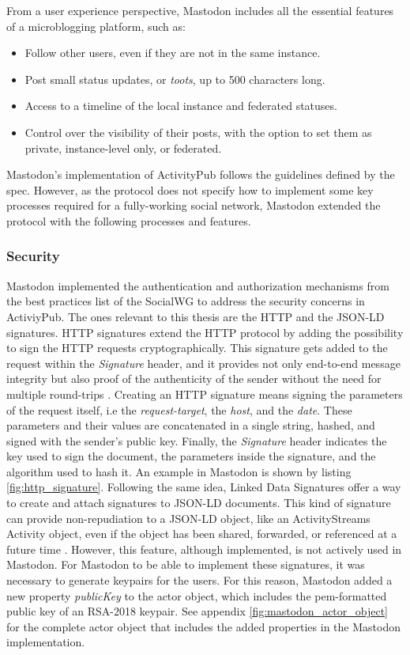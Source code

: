  From a user experience perspective, Mastodon includes all the essential features of a microblogging platform, such as:

\begin{itemize}
  \item Follow other users, even if they are not in the same instance. 
  \item Post small status updates, or \emph{toots}, up to 500 characters long. 
  \item Access to a timeline of the local instance and federated statuses. 
  \item Control over the visibility of their posts, with the option to set them as private, instance-level only, or federated. 
\end{itemize}

Mastodon's implementation of ActivityPub follows the guidelines defined by the spec. However, as the protocol does not specify how to implement some key processes required for a fully-working social network, Mastodon extended the protocol with the following processes and features.

\subsubsection*{\textbf{Security}}
Mastodon implemented the authentication and authorization mechanisms from the best practices list of the SocialWG to address the security concerns in ActiviyPub. The ones relevant to this thesis are the HTTP and the JSON-LD signatures. HTTP signatures extend the HTTP protocol by adding the possibility to sign the HTTP requests cryptographically. This signature gets added to the request within the \emph{Signature} header, and it provides not only end-to-end message integrity but also proof of the authenticity of the sender without the need for multiple round-trips \cite{cavage_sporny_2019}. Creating an HTTP signature means signing the parameters of the request itself, i.e the \emph{request-target}, the \emph{host}, and the \emph{date}. These parameters and their values are concatenated in a single string, hashed, and signed with the sender's public key. Finally, the \emph{Signature} header indicates the key used to sign the document, the parameters inside the signature, and the algorithm used to hash it. An example in Mastodon is shown by listing \ref{fig:http_signature}. 
Following the same idea, Linked Data Signatures offer a way to create and attach signatures to JSON-LD documents. This kind of signature can provide non-repudiation to a JSON-LD object, like an ActivityStreams Activity object, even if the object has been shared, forwarded, or referenced at a future time \cite{celik_prodromou_le_hors_2014}. However, this feature, although implemented, is not actively used in Mastodon. For Mastodon to be able to implement these signatures, it was necessary to generate keypairs for the users. For this reason, Mastodon added a new property \emph{publicKey} to the actor object, which includes the pem-formatted public key of an RSA-2018 keypair. See appendix \ref{fig:mastodon_actor_object} for the complete actor object that includes the added properties in the Mastodon implementation.

